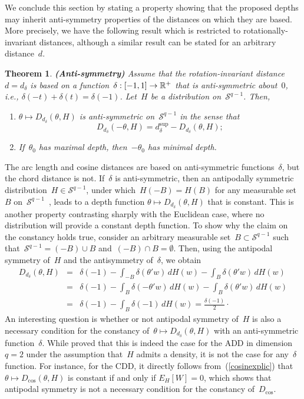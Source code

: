 \documentclass[usenames,dvipsnames]{article}
\newtheorem{thm}{Theorem}
\begin{document}
We conclude this section by stating a property showing that the proposed depths may inherit anti-symmetry properties of the distances on which they are based. More precisely, we have the following result which is restricted to rotationally-invariant distances, although a similar result can be stated for an arbitrary distance~$d$. 
\setlength{\topsep}{1.5em}
\begin{thm}{\textbf{(Anti-symmetry)}} 
\label{thskewsym}
Assume that the rotation-invariant distance~$d=d_\delta$ is based on a function~$\delta:[-1,1]\to \mathbb{R}^+$ that is anti-symmetric about~$0$, i.e., $\delta(-t)+\delta(t)=\delta(-1)$. Let~$H$ be a distribution on~$\mathcal{S}^{q-1}$. Then, 
\begin{enumerate}[label=(\roman*), topsep=0pt, itemsep=-1ex]
\item $\theta\mapsto D_{d_{\delta}}(\theta, H)$ is anti-symmetric on~$\mathcal{S}^{q-1}$ in the sense that
\begin{equation*}
D_{d_{\delta}}(-\theta, H)=d_{\delta}^{\sup}-D_{d_{\delta}}(\theta,H);
\end{equation*}
\item If~$\theta_0$ has maximal depth, then~$-\theta_0$ has minimal depth.  
\end{enumerate}
\end{thm}
The arc length and cosine distances are based on anti-symmetric functions~$\delta$, but the chord distance is not. 
If~$\delta$ is anti-symmetric, then an antipodally symmetric distribution~$H \in \mathcal{S}^{q-1}$, under which~$H(-B) = H(B)$ for any measurable set~$B$ on~$\mathcal{S}^{q-1}$~, leads to a depth function $\theta\mapsto D_{d_{\delta}}(\theta,H)$ that is constant. This is another property contrasting sharply with the Euclidean case, where no distribution will provide a constant depth function. 
To show why the claim on the constancy holds true, consider an arbitrary measurable set~$B\subset\mathcal{S}^{q-1}$ such that~$\mathcal{S}^{q-1}=(-B)\cup B$ and~$(-B)\cap B=\emptyset$. Then, using the antipodal symmetry of~$H$ and the antisymmetry of~$\delta$, we obtain 
\begin{eqnarray*}
 D_{d_{\delta}}(\theta,H)
&=&
 \delta(-1)
-
\int_{-B}
\delta(\theta'w)
\,
dH(w)
-
\int_{B}
\delta(\theta'w)
\,
dH(w)
%
\\[2mm]
&= & 
 \delta(-1)
-
\int_{B}
\delta(-\theta'w)
\,
dH(w)
-
\int_{B}
\delta(\theta'w)
\,
dH(w)
%
\\[2mm]
&= & 
 \delta(-1)
-
\int_{B}
\delta(-1)
\,
dH(w)
=
\frac{ \delta(-1)}{2}
\cdot
\end{eqnarray*}
An interesting question is whether or not antipodal symmetry of~$H$ is also a necessary condition for the constancy of~$\theta\mapsto D_{d_{\delta}}(\theta,H)$ with an anti-symmetric function~$\delta$. While \cite{LiuSin1992} proved that this is indeed the case for the ADD in dimension~$q=2$ under the assumption that~$H$ admits a density, it is not the case for any~$\delta$ function. For instance, for the CDD, it directly follows from~(\ref{cosinexplic}) that~$\theta\mapsto D_{\cos}(\theta, H)$ is constant if and only if $E_{H}[W]=0$, which shows that antipodal symmetry is not a necessary condition for the constancy of~$D_{\cos}$. 
\end{document}
